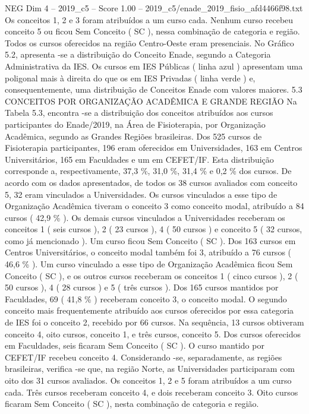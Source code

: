 \begin{textsample}{NEG Dim 4 – 2019\_c5 – Score 1.00 – 2019\_c5/enade\_2019\_fisio\_afd4466f98.txt}
Os conceitos 1, 2 e 3 foram atribuídos a um curso cada.
Nenhum curso recebeu conceito 5 ou ficou Sem Conceito ( SC ), nessa combinação de categoria e região.
Todos os cursos oferecidos na região Centro-Oeste eram presenciais.
No Gráfico 5.2, apresenta -se a distribuição do Conceito Enade, segundo a Categoria Administrativa da IES.
Os cursos em IES Públicas ( linha azul ) apresentam uma poligonal mais à direita do que os em IES Privadas ( linha verde ) e, consequentemente, uma distribuição de Conceitos Enade com valores maiores. 5.3 CONCEITOS POR ORGANIZAÇÃO ACADÊMICA E GRANDE REGIÃO Na Tabela 5.3, encontra -se a distribuição dos conceitos atribuídos aos cursos participantes do Enade/2019, na Área de Fisioterapia, por Organização Acadêmica, segundo as Grandes Regiões brasileiras.
Dos 525 cursos de Fisioterapia participantes, 196 eram oferecidos em Universidades, 163 em Centros Universitários, 165 em Faculdades e um em CEFET/IF.
Esta distribuição corresponde a, respectivamente, 37,3 \%, 31,0 \%, 31,4 \% e 0,2 \% dos cursos.
De acordo com os dados apresentados, de todos os 38 cursos avaliados com conceito 5, 32 eram vinculados a Universidades.
Os cursos vinculados a esse tipo de Organização Acadêmica tiveram o conceito 3 como conceito modal, atribuído a 84 cursos ( 42,9 \% ).
Os demais cursos vinculados a Universidades receberam os conceitos 1 ( seis cursos ), 2 ( 23 cursos ), 4 ( 50 cursos ) e conceito 5 ( 32 cursos, como já mencionado ).
Um curso ficou Sem Conceito ( SC ).
Dos 163 cursos em Centros Universitários, o conceito modal também foi 3, atribuído a 76 cursos ( 46,6 \% ).
Um curso vinculado a esse tipo de Organização Acadêmica ficou Sem Conceito ( SC ), e os outros cursos receberam os conceitos 1 ( cinco cursos ), 2 ( 50 cursos ), 4 ( 28 cursos ) e 5 ( três cursos ).
Dos 165 cursos mantidos por Faculdades, 69 ( 41,8 \% ) receberam conceito 3, o conceito modal.
O segundo conceito mais frequentemente atribuído aos cursos oferecidos por essa categoria de IES foi o conceito 2, recebido por 66 cursos.
Na sequência, 13 cursos obtiveram conceito 4, oito cursos, conceito 1, e três cursos, conceito 5.
Dos cursos oferecidos em Faculdades, seis ficaram Sem Conceito ( SC ).
O curso mantido por CEFET/IF recebeu conceito 4.
Considerando -se, separadamente, as regiões brasileiras, verifica -se que, na região Norte, as Universidades participaram com oito dos 31 cursos avaliados.
Os conceitos 1, 2 e 5 foram atribuídos a um curso cada.
Três cursos receberam conceito 4, e dois receberam conceito 3.
Oito cursos ficaram Sem Conceito ( SC ), nesta combinação de categoria e região.

\end{textsample}
